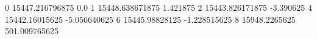 0 15447.216796875 0.0
1 15448.638671875 1.421875
2 15443.826171875 -3.390625
4 15442.16015625 -5.056640625
6 15445.98828125 -1.228515625
8 15948.2265625 501.009765625

